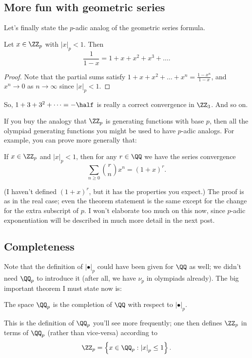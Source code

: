 \subsection{More fun with geometric series}
Let's finally state the $p$-adic analog of the geometric series formula.

\begin{proposition}
	Let $x \in \ZZ_p$ with $\left\lvert x \right\rvert_p < 1$.
	Then \[ \frac{1}{1-x} = 1 + x + x^2 + x^3 + \dots. \]
\end{proposition}
\begin{proof}
	Note that the partial sums satisfy
	$1 + x + x^2 + \dots + x^n = \frac{1-x^n}{1-x}$,
	and $x^n \to 0$ as $n \to \infty$ since
	$\left\lvert x \right\rvert_p < 1$.
\end{proof}

So, $1 + 3 + 3^2 + \dots = -\half$ is really a correct convergence
in $\ZZ_3$.
And so on.

If you buy the analogy that $\ZZ_p$ is generating functions
with base $p$, then all the olympiad generating functions
you might be used to have $p$-adic analogs.
For example, you can prove more generally that:
\begin{theorem}
	If $x \in \ZZ_p$ and $\left\lvert x \right\rvert_p < 1$,
	then for any $r \in \QQ$ we have the series convergence
	\[ \sum_{n \ge 0} \binom rn x^n = (1+x)^r. \]
\end{theorem}
(I haven't defined $(1+x)^r$, but it has the properties you expect.)
The proof is as in the real case;
even the theorem statement is the same
except for the change for the extra subscript of $p$.
I won't elaborate too much on this now,
since $p$-adic exponentiation will be described in much
more detail in the next post.

\subsection{Completeness}
Note that the definition of $\left\lvert \bullet \right\rvert_p$
could have been given for $\QQ$ as well;
we didn't need $\QQ_p$ to introduce it
(after all, we have $\nu_p$ in olympiads already).
The big important theorem I must state now is:
\begin{theorem}
	[$\QQ_p$ is complete]
	The space $\QQ_p$ is the completion of $\QQ$
	with respect to $\left\lvert \bullet \right\rvert_p$.
\end{theorem}
This is the definition of $\QQ_p$ you'll see more frequently;
one then defines $\ZZ_p$ in terms of $\QQ_p$
(rather than vice-versa) according to
\[ \ZZ_p = \left\{ x \in \QQ_p :
	\left\lvert x \right\rvert_p \le 1 \right\}. \]

